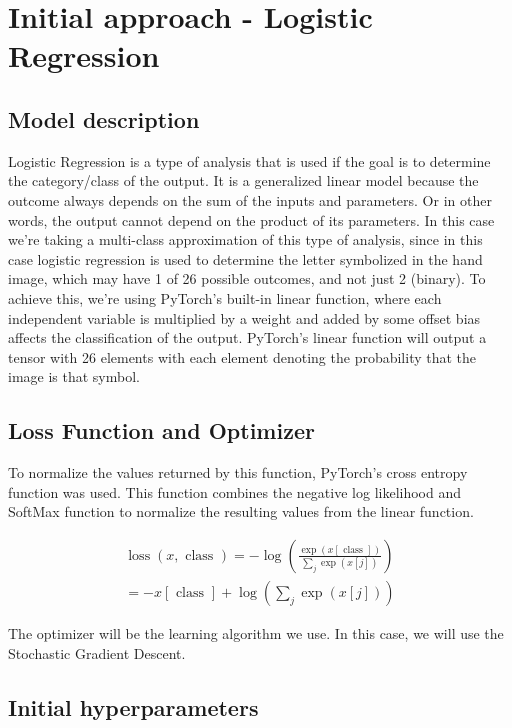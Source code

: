 \documentclass[conference]{IEEEtran}
\begin{document}
\section{Initial approach - Logistic Regression}
\subsection{Model description}
Logistic Regression is a type of analysis that is used if the goal is to determine the category/class of the output. It is a generalized linear model because the outcome always depends on the sum of the inputs and parameters. Or in other words, the output cannot depend on the product of its parameters.\cite{raschka}
In this case we’re taking a multi-class approximation of this type of analysis, since in this case logistic regression is used to determine the letter symbolized in the hand image, which may have 1 of 26 possible outcomes, and not just 2 (binary).
To achieve this, we’re using PyTorch’s built-in linear function, where each independent variable is multiplied by a weight and added by some offset bias affects the classification of the output.\cite{logistic-torch}
PyTorch’s linear function will output a tensor with 26 elements with each element denoting the probability that the image is that symbol.

\subsection{Loss Function and Optimizer}
To normalize the values returned by this function, PyTorch’s cross entropy function was used. This function combines the negative log likelihood and SoftMax function to normalize the resulting values from the linear function.\cite{logistic-torch}

\begin{equation}
\begin{split}
\operatorname{loss}(x, \text { class })=-\log \left(\frac{\exp (x[\text { class }])}{\sum_{j} \exp (x[j])}\right) \\
=-x[\text { class }]+\log \left(\sum_{j} \exp (x[j])\right)
\end{split}
\end{equation}

The optimizer will be the learning algorithm we use. In this case, we will use the Stochastic Gradient Descent.
\subsection{Initial hyperparameters}
\end{document}
